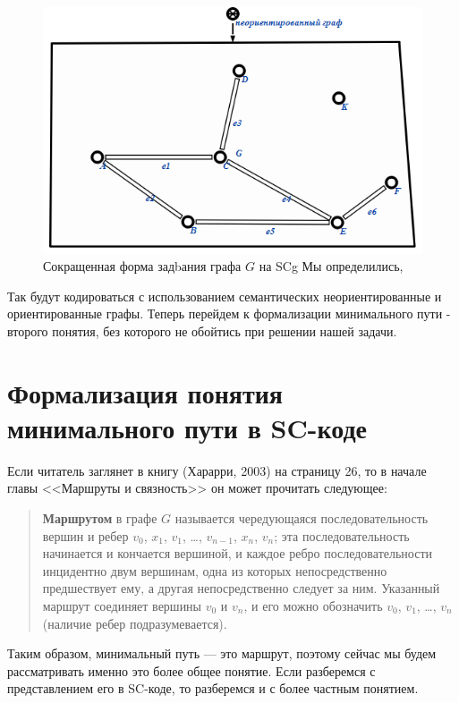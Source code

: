 \begin{figure}[h!]
  \centering
  \includegraphics[scale=0.6]{images/2/Undirected_graph_Short_form}
  \caption{Сокращенная форма задbания графа $G$ на SCg Мы определились,}
  \label{fig:Undirected_graph_Short_form}
\end{figure}

Так будут кодироваться с использованием семантических
неориентированные и ориентированные графы. Теперь перейдем к
формализации минимального пути - второго понятия, без которого не
обойтись при решении нашей задачи.

\section{Формализация понятия минимального пути в SC-коде}

Если читатель заглянет в книгу (Харарри, 2003) на страницу 26, то в
начале главы <<Маршруты и связность>> он может прочитать следующее:


\begin{quotation}
  \textbf{Маршрутом} в графе $G$ называется чередующаяся
  последовательность вершин и ребер $v_0$, $x_1$, $v_1$, …, $v_{n-1}$,
  $x_n$, $v_n$; эта последовательность начинается и кончается
  вершиной, и каждое ребро последовательности инцидентно двум
  вершинам, одна из которых непосредственно предшествует ему, а другая
  непосредственно следует за ним. Указанный маршрут соединяет вершины
  $v_0$ и $v_n$, и его можно обозначить $v_0$, $v_1$, …, $v_n$
  (наличие ребер подразумевается).
\end{quotation}

Таким образом, минимальный путь — это маршрут, поэтому сейчас мы будем
рассматривать именно это более общее понятие. Если разберемся с
представлением его в SC-коде, то разберемся и с более частным
понятием.

